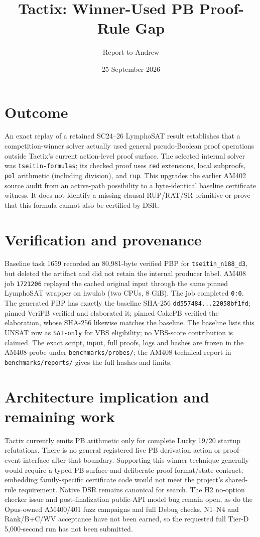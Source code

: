 \documentclass[11pt]{article}
\title{Tactix: Winner-Used PB Proof-Rule Gap}
\author{Report to Andrew}
\date{25 September 2026}
\begin{document}
\maketitle
\vspace{-1.5em}

\section*{Outcome}
An exact replay of a retained SC24--26 LymphoSAT result establishes that a
competition-winner solver actually used general pseudo-Boolean proof operations
outside Tactix's current action-level proof surface. The selected internal
solver was \texttt{tseitin-formulas}; its checked proof uses \texttt{red}
extensions, local subproofs, \texttt{pol} arithmetic (including division), and
\texttt{rup}. This upgrades the earlier AM402 source audit from an active-path
possibility to a byte-identical baseline certificate witness. It does not
identify a missing clausal RUP/RAT/SR primitive or prove that this formula
cannot also be certified by DSR.

\section*{Verification and provenance}
Baseline task 1659 recorded an 80,981-byte verified PBP for
\texttt{tseitin\_n188\_d3}, but deleted the artifact and did not retain the
internal producer label. AM408 job \texttt{1721206} replayed the cached original
input through the same pinned LymphoSAT wrapper on hwulab (two CPUs, 8 GiB).
The job completed \texttt{0:0}. The generated PBP has exactly the baseline
SHA-256 \texttt{dd557484...22058bf1fd}; pinned VeriPB verified and elaborated
it; pinned CakePB verified the elaboration, whose SHA-256 likewise matches the
baseline. The baseline lists this UNSAT row as \texttt{SAT-only} for VBS
eligibility; no VBS-score contribution is claimed. The exact script, input, full proofs, logs and hashes are frozen in
the AM408 probe under \texttt{benchmarks/probes/}; the AM408 technical
report in \texttt{benchmarks/reports/} gives the full hashes and limits.

\section*{Architecture implication and remaining work}
Tactix currently emits PB arithmetic only for complete Lucky 19/20 startup
refutations. There is no general registered live PB derivation action or
proof-event interface after that boundary. Supporting this winner technique
generally would require a typed PB surface and deliberate proof-format/state
contract; embedding family-specific certificate code would not meet the
project's shared-rule requirement. Native DSR remains canonical for search.
The H2 no-option checker issue and post-finalization public-API model bug
remain open, as do the Opus-owned AM400/401 fuzz campaigns and full Debug
checks. N1--N4 and Rank/B+C/WV acceptance have not been earned, so the
requested full Tier-D 5,000-second run has not been submitted.
\end{document}
